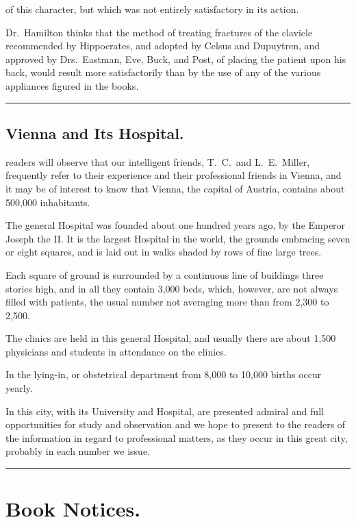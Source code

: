 of this character, but which was not entirely satisfactory in its
action.

Dr.~Hamilton thinks that the method of treating fractures of the clavicle
recommended by Hippocrates, and adopted by Celsus and Dupuytren,
and approved by Drs.~Eastman, Eve, Buck, and Post, of placing the
patient upon his back, would result more satisfactorily than by the use
of any of the various appliances figured in the books.

\fancybreak{*}

\subsection*{Vienna and Its Hospital.}

 readers will observe that our intelligent friends,  T.~C.\ and
L.~E.\ Miller, frequently refer to their experience and their professional
friends in Vienna, and it may be of interest to know that Vienna, the
capital of Austria, contains about 500,000 inhabitants.

The general Hospital was founded about one hundred years ago, by
the Emperor Joseph the II. It is the largest Hospital in the world,
the grounds embracing seven or eight squares, and is laid out in walks
shaded by rows of fine large trees.

Each square of ground is surrounded by a continuous line of buildings
three stories high, and in all they contain 3,000 beds, which, however,
are not always filled with patients, the usual number not averaging
more than from 2,300 to 2,500.

The clinics are held in this general Hospital, and usually there are
about 1,500 physicians and students in attendance on the clinics.

In the lying-in, or obstetrical department from 8,000 to 10,000 births
occur yearly.

In this city, with its University and Hospital, are presented admiral
and full opportunities for study and observation and we hope to present
to the readers of the  information in regard to
professional matters, as they occur in this great city, probably in each
number we issue.

\fancybreak{*}

\section*{Book Notices.}

